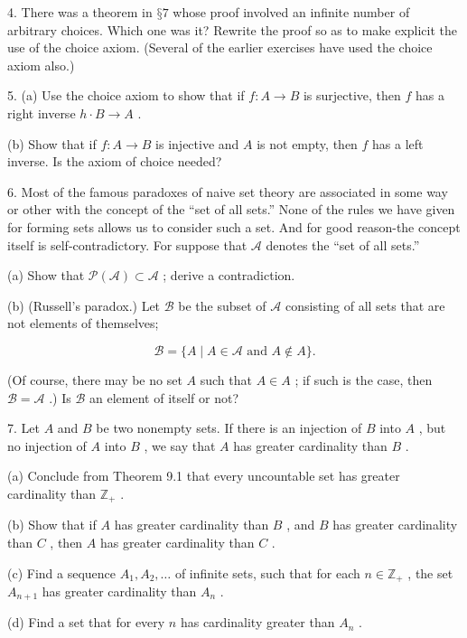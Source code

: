 4. There was a theorem in \(§7\) whose proof involved an infinite number of arbitrary choices. Which one was it? Rewrite the proof so as to make explicit the use of the choice axiom. (Several of the earlier exercises have used the choice axiom also.)

5. (a) Use the choice axiom to show that if \(f : A \rightarrow  B\) is surjective, then \(f\) has a right inverse \(h \cdot  B \rightarrow  A\) .

(b) Show that if \(f : A \rightarrow  B\) is injective and \(A\) is not empty, then \(f\) has a left inverse. Is the axiom of choice needed?

6. Most of the famous paradoxes of naive set theory are associated in some way or other with the concept of the ``set of all sets.'' None of the rules we have given for forming sets allows us to consider such a set. And for good reason-the concept itself is self-contradictory. For suppose that \(\mathcal{A}\) denotes the ``set of all sets.''

(a) Show that \(\mathcal{P}\left( \mathcal{A}\right)  \subset  \mathcal{A}\) ; derive a contradiction.

(b) (Russell’s paradox.) Let \(\mathcal{B}\) be the subset of \(\mathcal{A}\) consisting of all sets that are not elements of themselves;

\[
\mathcal{B} = \{ A \mid  A \in  \mathcal{A}\text{ and }A \notin  A\} .
\]

(Of course, there may be no set \(A\) such that \(A \in  A\) ; if such is the case, then \(\mathcal{B} = \mathcal{A}\) .) Is \(\mathcal{B}\) an element of itself or not?

7. Let \(A\) and \(B\) be two nonempty sets. If there is an injection of \(B\) into \(A\) , but no injection of \(A\) into \(B\) , we say that \(A\) has greater cardinality than \(B\) .

(a) Conclude from Theorem 9.1 that every uncountable set has greater cardinality than \({\mathbb{Z}}_{ + }\) .

(b) Show that if \(A\) has greater cardinality than \(B\) , and \(B\) has greater cardinality than \(C\) , then \(A\) has greater cardinality than \(C\) .

(c) Find a sequence \({A}_{1},{A}_{2},\ldots\) of infinite sets, such that for each \(n \in  {\mathbb{Z}}_{ + }\) , the set \({A}_{n + 1}\) has greater cardinality than \({A}_{n}\) .

(d) Find a set that for every \(n\) has cardinality greater than \({A}_{n}\) .

